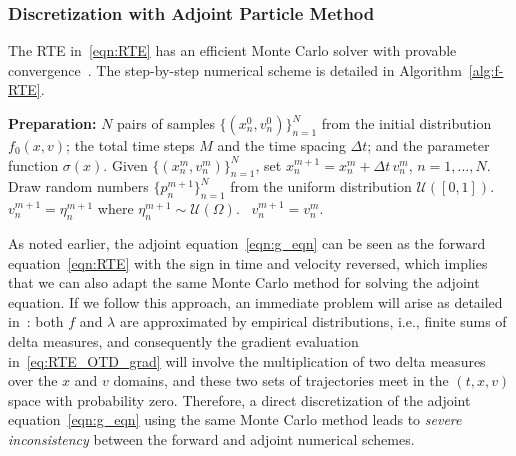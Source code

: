 \documentclass[12pt]{amsart}
\begin{document}
\subsubsection{Discretization with Adjoint Particle Method}\label{subsec:P-OTD}
The RTE in~\eqref{eqn:RTE} has an efficient Monte Carlo solver with provable convergence~\cite[Theorem 2.1]{li2022monte}. The step-by-step numerical scheme is detailed in Algorithm~\ref{alg:f-RTE}. 
\begin{algorithm}
\caption{Monte Carlo Method for Solving the Forward RTE~\eqref{eqn:RTE}\label{alg:f-RTE}}
\begin{algorithmic}[1]
\State  \textbf{Preparation:} $N$ pairs of samples $\{(x_n^0,v_n^0)\}_{n=1}^N$ from the initial distribution $f_0(x,v)$; the total time steps $M$ and the time spacing $\Delta t$; and the parameter function $\sigma(x)$.
\State Given $\{(x_n^m,v_n^m)\}_{n=1}^N$, set $x_n^{m+1} = x_n^m + \Delta t \,  v_n^m$, $n=1,\ldots,N$.
\State Draw random numbers $\{p^{m+1}_n\}_{n=1}^N$ from the uniform distribution $\mathcal{U}([0,1])$.
  $v_n^{m+1} = \eta_n^{m+1}$ where $\eta_n^{m+1}\sim\mathcal{U}(\Omega)$.
\Else  \, $v_n^{m+1} = v_n^{m}$.
\EndIf
\EndFor
\end{algorithmic}
\end{algorithm}
As noted earlier, the adjoint equation~\eqref{eqn:g_eqn} can be seen as the forward equation~\eqref{eqn:RTE} with the sign in time and velocity reversed, which implies that we can also adapt the same Monte Carlo method for solving the adjoint equation.  If we follow this approach, an immediate  problem will arise as detailed in~\cite[Section 2.2]{li2022monte}: both $f$ and $\lambda$ are approximated by empirical distributions, i.e., finite sums of delta measures, and consequently the gradient evaluation in~\eqref{eq:RTE_OTD_grad} will involve the multiplication of two delta measures over the $x$ and $v$ domains, and these two sets of trajectories meet in the $(t,x,v)$ space with probability zero. 
Therefore, a direct discretization of the adjoint equation~\eqref{eqn:g_eqn} using the same Monte Carlo method leads to \textit{severe inconsistency} between the forward and adjoint numerical schemes. 
\end{document}

